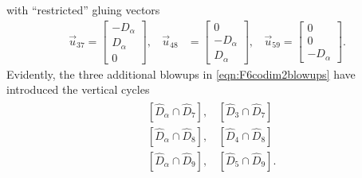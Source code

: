 \documentclass[11pt,oneside,english]{article}
\numberwithin{equation}{section}
\theoremstyle{definition}
\begin{document}
with ``restricted'' gluing vectors
	\begin{align}
		\vec u_{37}=\begin{bmatrix}
			-D_\alpha \\
			D_\alpha \\ 0
		\end{bmatrix},~~~~ \vec u_{48} &=\begin{bmatrix}
		0\\
			-D_\alpha \\
			D_\alpha 
		\end{bmatrix},~~~~\vec u_{59} =\begin{bmatrix}
			0\\
			0 \\ -D_\alpha
		\end{bmatrix}.
	\end{align}
Evidently, the three additional blowups in \cref{eqn:F6codim2blowups} have introduced the vertical cycles
	\begin{align}
	\begin{split}
		&[\hat D_\alpha \cap \hat D_7], ~~~~ [\hat D_3 \cap \hat D_7]\\
		&[\hat D_\alpha \cap \hat D_8], ~~~~ [\hat D_4 \cap \hat D_8]\\
		&[\hat D_\alpha \cap \hat D_9], ~~~~ [\hat D_5 \cap  \hat D_9].
	\end{split}
	\end{align}
\end{document}
